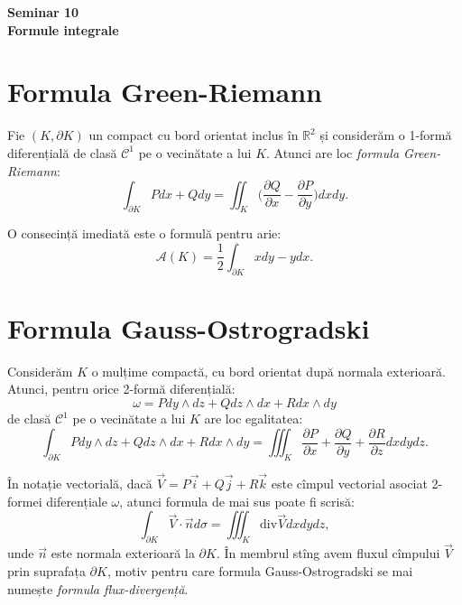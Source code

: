 \documentclass[12pt,a4paper]{article}
\newcommand\kal{\mathcal}
\newcommand\RR{\mathbb{R}}
\theoremstyle{dotless}
\theoremstyle{dotlessdr}
\begin{document}
\begin{center}
  {\large\textbf{Seminar 10 \\ Formule integrale}}
\end{center}

\vspace{2cm}


\section{Formula Green-Riemann}
\label{sec:g-r}

Fie $(K, \partial K)$ un compact cu bord orientat inclus în $\RR^2$ și considerăm
o 1-formă diferențială de clasă $\kal{C}^1$ pe o vecinătate a lui $K$. Atunci
are loc \emph{formula Green-Riemann}:
\[
  \int_{\partial K} Pdx + Qdy = \iint_K \Big(\frac{\partial Q}{\partial x} - %
  \frac{\partial P}{\partial y} \Big) dx dy.
\]

O consecință imediată este o formulă pentru arie:
\[
  \mathcal{A}(K) = \frac{1}{2} \int_{\partial K} xdy - ydx.
\]


\section{Formula Gauss-Ostrogradski}
\label{sec:g-o}

Considerăm $K$ o mulțime compactă, cu bord orientat după normala exterioară. Atunci,
pentru orice 2-formă diferențială:
\[
  \omega = Pdy \wedge dz + Q dz \wedge dx + R dx \wedge dy
\]
de clasă $\kal{C}^1$ pe o vecinătate a lui $K$ are loc egalitatea:
\[
  \int_{\partial K} P dy \wedge dz + Q dz \wedge dx + R dx \wedge dy = %
  \iiint_K \frac{\partial P}{\partial x} + \frac{\partial Q}{\partial y} + %
  \frac{\partial R}{\partial z} dxdydz.
\]

În notație vectorială, dacă $\vec{V} = P \vec{i} + Q \vec{j} + R \vec{k}$ este
cîmpul vectorial asociat 2-formei diferențiale $\omega$, atunci formula de mai sus
poate fi scrisă:
\[
  \int_{\partial K} \vec{V} \cdot \vec{n} d \sigma = \iiint_K \mathrm{div}\vec{V} dxdydz,
\]
unde $\vec{n}$ este normala exterioară la $\partial K$. În membrul stîng avem
fluxul cîmpului $\vec{V}$ prin suprafața $\partial K$, motiv pentru care formula
Gauss-Ostrogradski se mai numește \emph{formula flux-divergență}.

\end{document}
